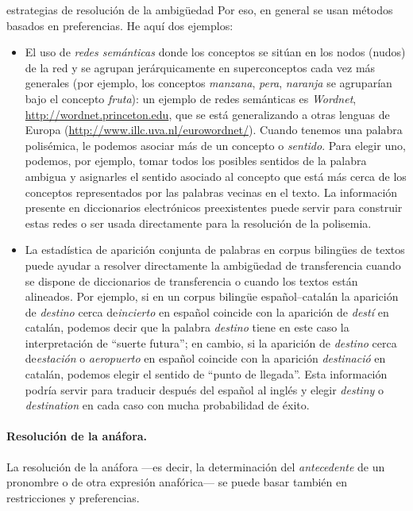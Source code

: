 \begin{persabermes}{estrategias de resolución de la ambigüedad}
Por eso, en general se usan métodos basados en preferencias. He aquí dos ejemplos: \begin{itemize} \item El uso de \emph{redes semánticas} donde los conceptos se sitúan en los nodos (nudos) de la red y se agrupan jerárquicamente en superconceptos cada vez más generales (por ejemplo, los conceptos \emph{manzana}, \emph{pera}, \emph{naranja} se agruparían bajo el concepto \emph{fruta}): un ejemplo de redes semánticas es \emph{Wordnet}, \url{http://wordnet.princeton.edu}, que se está generalizando a otras lenguas de Europa (\url{http://www.illc.uva.nl/eurowordnet/}). Cuando tenemos una palabra polisémica, le podemos asociar más de un concepto o \emph{sentido}. Para elegir uno, podemos, por ejemplo, tomar todos los posibles sentidos de la palabra ambigua y asignarles el sentido asociado al concepto que está más cerca de los conceptos representados por las palabras vecinas en el texto. La información presente en diccionarios electrónicos preexistentes puede servir para construir estas redes o ser usada directamente para la resolución de la polisemia. \item La estadística de aparición conjunta de palabras en corpus bilingües de textos puede ayudar a resolver directamente la ambigüedad de transferencia cuando se dispone de diccionarios de transferencia o cuando los textos están alineados. Por ejemplo, si en un corpus bilingüe español--catalán la aparición de \emph{destino} cerca de\emph{incierto} en español coincide con la aparición de \emph{destí} en catalán, podemos decir que la palabra \emph{destino} tiene en este caso la interpretación de ``suerte futura''; en cambio, si la aparición de {\em destino} cerca de\emph{estación} o \emph{aeropuerto} en español coincide con la aparición \emph{destinació} en catalán, podemos elegir el sentido de ``punto de llegada''. Esta información podría servir para traducir después del español al inglés y elegir {\em destiny} o \emph{destination} en cada caso con mucha probabilidad de éxito. 

\end{itemize} 

\paragraph{Resolución de la anáfora.} La resolución de la anáfora ---es decir, la determinación del {\em antecedente} de un pronombre o de otra expresión anafórica--- se puede basar también en restricciones y preferencias. 


\end{persabermes}
